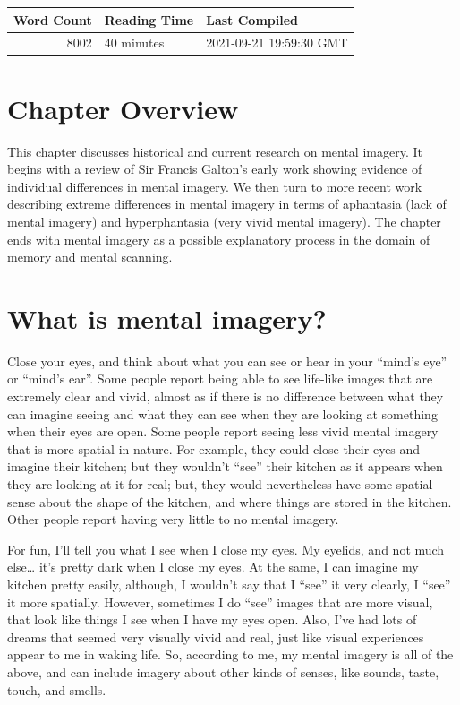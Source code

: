 \documentclass[
  oneside,
  12pt]{crumpbook}
\begin{document}
\begin{tabular}{r|l|l}
\hline
Word Count & Reading Time & Last Compiled\\
\hline
8002 & 40 minutes & 2021-09-21 19:59:30 GMT\\
\hline
\end{tabular}

\hypertarget{chapter-overview-1}{%
\section{Chapter Overview}\label{chapter-overview-1}}

This chapter discusses historical and current research on mental imagery. It begins with a review of Sir Francis Galton's early work showing evidence of individual differences in mental imagery. We then turn to more recent work describing extreme differences in mental imagery in terms of aphantasia (lack of mental imagery) and hyperphantasia (very vivid mental imagery). The chapter ends with mental imagery as a possible explanatory process in the domain of memory and mental scanning.

\hypertarget{what-is-mental-imagery}{%
\section{What is mental imagery?}\label{what-is-mental-imagery}}

Close your eyes, and think about what you can see or hear in your ``mind's eye'' or ``mind's ear''. Some people report being able to see life-like images that are extremely clear and vivid, almost as if there is no difference between what they can imagine seeing and what they can see when they are looking at something when their eyes are open. Some people report seeing less vivid mental imagery that is more spatial in nature. For example, they could close their eyes and imagine their kitchen; but they wouldn't ``see'' their kitchen as it appears when they are looking at it for real; but, they would nevertheless have some spatial sense about the shape of the kitchen, and where things are stored in the kitchen. Other people report having very little to no mental imagery.

For fun, I'll tell you what I see when I close my eyes. My eyelids, and not much else\ldots{} it's pretty dark when I close my eyes. At the same, I can imagine my kitchen pretty easily, although, I wouldn't say that I ``see'' it very clearly, I ``see'' it more spatially. However, sometimes I do ``see'' images that are more visual, that look like things I see when I have my eyes open. Also, I've had lots of dreams that seemed very visually vivid and real, just like visual experiences appear to me in waking life. So, according to me, my mental imagery is all of the above, and can include imagery about other kinds of senses, like sounds, taste, touch, and smells.
\end{document}
